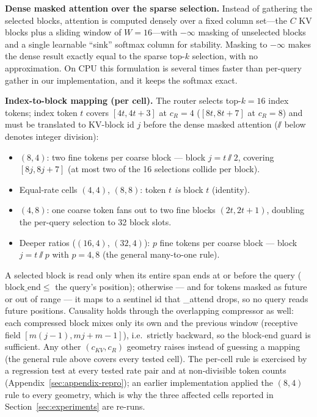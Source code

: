 \textbf{Dense masked attention over the sparse selection.} Instead of
gathering the selected blocks, attention is computed densely over a fixed
column set---the $C$ KV blocks plus a sliding window of $W{=}16$---with
$-\infty$ masking of unselected blocks and a single learnable ``sink''
softmax column for stability. Masking to $-\infty$ makes the dense result
exactly equal to the sparse top-$k$ selection, with no approximation. On
CPU this formulation is several times faster than per-query gather in our
implementation, and it keeps the softmax exact.

\textbf{Index-to-block mapping (per cell).} The router selects top-$k{=}16$ index
tokens; index token $t$ covers $[4t, 4t{+}3]$ at $c_R{=}4$ ($[8t, 8t{+}7]$ at $c_R{=}8$)
and must be translated to KV-block id $j$ before the dense masked attention
($\sslash$ below denotes integer division):
\begin{itemize}
  \item $(8,4)$: two fine tokens per coarse block --- block $j = t \sslash 2$,
        covering $[8j, 8j{+}7]$ (at most two of the 16 selections collide per block).
  \item Equal-rate cells $(4,4)$, $(8,8)$: token $t$ \emph{is} block $t$ (identity).
  \item $(4,8)$: one coarse token fans out to two fine blocks $(2t, 2t{+}1)$,
        doubling the per-query selection to 32 block slots.
  \item Deeper ratios ($(16,4)$, $(32,4)$): $p$ fine tokens per coarse block --- block
        $j = t \sslash p$ with $p = 4, 8$ (the general many-to-one rule).
\end{itemize}
A selected block is read only when its entire span ends at or before the query
($\mathrm{block\_end} \le$ the query's position); otherwise --- and for tokens masked as future or
out of range --- it maps to a sentinel id that \_attend drops, so no query reads
future positions. Causality holds through the overlapping compressor as well: each
compressed block mixes only its own and the previous window (receptive field
$[m(j{-}1), mj{+}m{-}1]$), i.e.\ strictly backward, so the block-end guard is
sufficient. Any other $(c_{KV}, c_R)$ geometry raises instead of guessing a mapping
(the general rule above covers every tested cell).
The per-cell rule is exercised by a regression test at every tested rate pair and
at non-divisible token counts (Appendix~\ref{sec:appendix-repro}); an earlier
implementation applied the $(8,4)$ rule to every geometry, which is why the three
affected cells reported in Section~\ref{sec:experiments} are re-runs.

